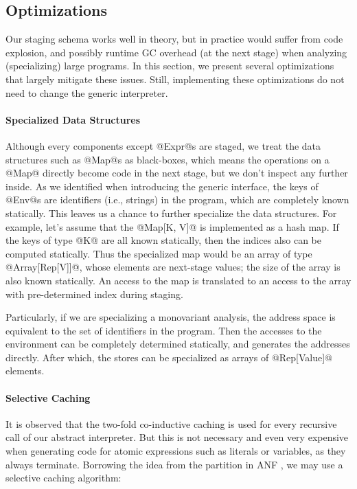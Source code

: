 \subsection{Optimizations} \label{staged_ds}

Our staging schema works well in theory, but in practice would suffer from code
explosion, and possibly runtime GC overhead (at the next stage) when analyzing
(specializing) large programs. In this section, we present several optimizations
that largely mitigate these issues. Still, implementing these optimizations do
not need to change the generic interpreter.

\paragraph{Specialized Data Structures}

Although every components except @Expr@s are staged, we treat the data
structures such as @Map@s as black-boxes, which means the operations on a @Map@
directly become code in the next stage, but we don't inspect any further inside.
As we identified when introducing the generic interface, the keys of @Env@s are
identifiers (i.e., strings) in the program, which are completely known
statically. This leaves us a chance to further specialize the data structures.
For example, let's assume that the @Map[K, V]@ is implemented as a hash map. If
the keys of type @K@ are all known statically, then the indices also can be
computed statically. Thus the specialized map would be an array of type
@Array[Rep[V]]@, whose elements are next-stage values; the size of the array is
also known statically. An access to the map is translated to an access to the
array with pre-determined index during staging.

Particularly, if we are specializing a monovariant analysis, the address space
is equivalent to the set of identifiers in the program. Then the accesses to the
environment can be completely determined statically, and generates the addresses
directly. After which, the stores can be specialized as arrays of @Rep[Value]@
elements.

\paragraph{Selective Caching} It is observed that the two-fold co-inductive
caching is used for every recursive call of our abstract interpreter. But this
is not necessary and even very expensive when generating code for atomic
expressions such as literals or variables, as they always terminate. Borrowing
the idea from the partition in ANF \cite{Flanagan:1993:ECC:155090.155113}, we
may use a selective caching algorithm:

